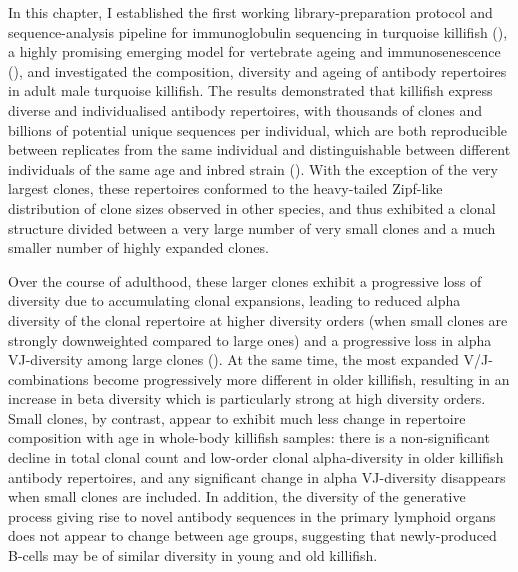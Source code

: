 In this chapter, I established the first working library-preparation protocol and sequence-analysis pipeline for immunoglobulin sequencing in turquoise killifish (\nfu), a highly promising emerging model for vertebrate ageing and immunosenescence (), and investigated the composition, diversity and ageing of antibody repertoires in adult male turquoise killifish. The results demonstrated that killifish express diverse and individualised antibody repertoires, with thousands of clones and billions of potential unique sequences per individual, which are both reproducible between replicates from the same individual and distinguishable between different individuals of the same age and inbred strain (). With the exception of the very largest clones, these repertoires conformed to the heavy-tailed Zipf-like distribution of clone sizes observed in other species, and thus exhibited a clonal structure divided between a very large number of very small clones and a much smaller number of highly expanded clones.

Over the course of adulthood, these larger clones exhibit a progressive loss of diversity due to accumulating clonal expansions, leading to reduced alpha diversity of the clonal repertoire at higher diversity orders (when small clones are strongly downweighted compared to large ones) and a progressive loss in alpha VJ-diversity among large clones (). At the same time, the most expanded V/J-combinations become progressively more different in older killifish, resulting in an increase in beta diversity which is particularly strong at high diversity orders. Small clones, by contrast, appear to exhibit much less change in repertoire composition with age in whole-body killifish samples: there is a non-significant decline in total clonal count and low-order clonal alpha-diversity in older killifish antibody repertoires, and any significant change in alpha VJ-diversity disappears when small clones are included. In addition, the diversity of the generative process giving rise to novel antibody sequences in the primary lymphoid organs does not appear to change between age groups, suggesting that newly-produced \naive B-cells may be of similar diversity in young and old killifish.


